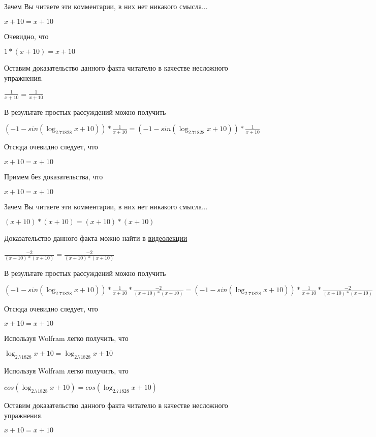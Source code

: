 \documentclass[12pt,a4paper,fleqn]{article}
\theoremstyle{definition}
\begin{document}
Зачем Вы читаете эти комментарии, в них нет никакого смысла... 

$ x  +  10  =  x  +  10 $

Очевидно, что 

$ 1  * ( x  +  10 ) =  x  +  10 $

Оставим доказательство данного факта читателю в качестве несложного упражнения. 

$\frac{ 1 }{ x  +  10 }
 = \frac{ 1 }{ x  +  10 }
$

В результате простых рассуждений можно получить 

$( -1  - sin(\log_{ 2.71828 }{ x  +  10 })) * \frac{ 1 }{ x  +  10 }
 = ( -1  - sin(\log_{ 2.71828 }{ x  +  10 })) * \frac{ 1 }{ x  +  10 }
$

Отсюда очевидно следует, что 

$ x  +  10  =  x  +  10 $

Примем без доказательства, что 

$ x  +  10  =  x  +  10 $

Зачем Вы читаете эти комментарии, в них нет никакого смысла... 

$( x  +  10 ) * ( x  +  10 ) = ( x  +  10 ) * ( x  +  10 )$

Доказательство данного факта можно найти в \href{https://www.youtube.com/watch?v=dQw4w9WgXcQ}{видеолекции} 

$\frac{ -2 }{( x  +  10 ) * ( x  +  10 )}
 = \frac{ -2 }{( x  +  10 ) * ( x  +  10 )}
$

В результате простых рассуждений можно получить 

$( -1  - sin(\log_{ 2.71828 }{ x  +  10 })) * \frac{ 1 }{ x  +  10 }
 * \frac{ -2 }{( x  +  10 ) * ( x  +  10 )}
 = ( -1  - sin(\log_{ 2.71828 }{ x  +  10 })) * \frac{ 1 }{ x  +  10 }
 * \frac{ -2 }{( x  +  10 ) * ( x  +  10 )}
$

Отсюда очевидно следует, что 

$ x  +  10  =  x  +  10 $

Используя Wolfram легко получить, что 

$\log_{ 2.71828 }{ x  +  10 } = \log_{ 2.71828 }{ x  +  10 }$

Используя Wolfram легко получить, что 

$cos(\log_{ 2.71828 }{ x  +  10 }) = cos(\log_{ 2.71828 }{ x  +  10 })$

Оставим доказательство данного факта читателю в качестве несложного упражнения. 

$ x  +  10  =  x  +  10 $
\end{document}
